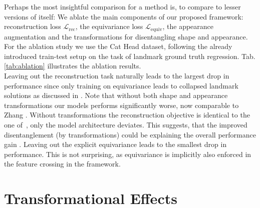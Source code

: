 			Perhaps the most insightful comparison for a method is, to compare to lesser versions of itself:
			We ablate the main components of our proposed framework: reconstruction loss $\mathcal{L}_{\textrm{rec}}$, the equivariance loss $\mathcal{L}_{\textrm{equiv}}$, the appearance augmentation and the transformations for disentangling shape and appearance. For the ablation study we use the Cat Head dataset, following the already introduced train-test setup on the task of landmark ground truth regression. Tab. \ref{tab:ablation} illustrates the ablation results.\\
			Leaving out the reconstruction task naturally leads to the largest drop in performance since only training on equivariance leads to collapsed landmark solutions as discussed in \cite{zhang18}.
			Note that without both shape and appearance transformations our models performs significantly worse, now comparable to Zhang \etal \cite{zhang18}.
			Without transformations the reconstruction objective is identical to the one of~\cite{zhang18}, only the model architecture deviates.
			This suggests, that the improved disentanglement (by transformations) could be explaining the overall performance gain \wrt \cite{zhang18}.  %
			Leaving out the explicit equivariance leads to the smallest drop in performance. This is not surprising, as equivariance is implicitly also enforced in the feature crossing in the framework.



\section{Transformational Effects}\label{sec:transformations}



